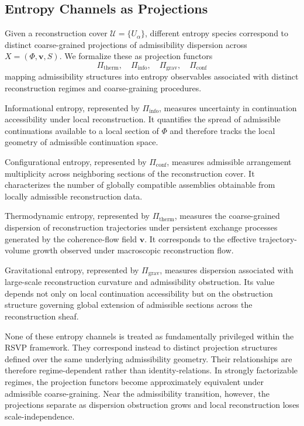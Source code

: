 \documentclass[11pt, a4paper]{article}
\theoremstyle{plain}
\theoremstyle{definition}
\theoremstyle{remark}
\newcommand{\cover}{\{U_\alpha\}}
\newcommand{\Ucover}{\mathcal{U}}
\begin{document}
\subsection{Entropy Channels as Projections}

Given a reconstruction cover $\Ucover = \cover$, different entropy species correspond
to distinct coarse-grained projections of admissibility dispersion across
$X = (\Phi, \mathbf{v}, S)$.  We formalize these as projection functors
\[
  \Pi_{\mathrm{therm}},\quad
  \Pi_{\mathrm{info}},\quad
  \Pi_{\mathrm{grav}},\quad
  \Pi_{\mathrm{conf}}
\]
mapping admissibility structures into entropy observables associated with distinct
reconstruction regimes and coarse-graining procedures.

Informational entropy, represented by $\Pi_{\mathrm{info}}$, measures uncertainty in
continuation accessibility under local reconstruction.  It quantifies the spread of
admissible continuations available to a local section of $\Phi$ and therefore tracks
the local geometry of admissible continuation space.

Configurational entropy, represented by $\Pi_{\mathrm{conf}}$, measures admissible
arrangement multiplicity across neighboring sections of the reconstruction cover.
It characterizes the number of globally compatible assemblies obtainable from locally
admissible reconstruction data.

Thermodynamic entropy, represented by $\Pi_{\mathrm{therm}}$, measures the
coarse-grained dispersion of reconstruction trajectories under persistent exchange
processes generated by the coherence-flow field $\mathbf{v}$.  It corresponds to the
effective trajectory-volume growth observed under macroscopic reconstruction flow.

Gravitational entropy, represented by $\Pi_{\mathrm{grav}}$, measures dispersion
associated with large-scale reconstruction curvature and admissibility obstruction.
Its value depends not only on local continuation accessibility but on the obstruction
structure governing global extension of admissible sections across the reconstruction
sheaf.

None of these entropy channels is treated as fundamentally privileged within the
RSVP framework.  They correspond instead to distinct projection structures defined
over the same underlying admissibility geometry.  Their relationships are therefore
regime-dependent rather than identity-relations.  In strongly factorizable regimes,
the projection functors become approximately equivalent under admissible
coarse-graining.  Near the admissibility transition, however, the projections
separate as dispersion obstruction grows and local reconstruction loses
scale-independence.
\end{document}
